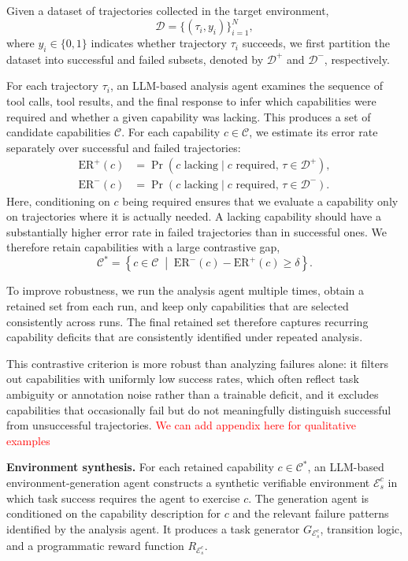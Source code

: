 Given a dataset of trajectories collected in the target environment,
\[
\mathcal{D} = \{(\tau_i, y_i)\}_{i=1}^{N},
\]
where $y_i \in \{0,1\}$ indicates whether trajectory $\tau_i$ succeeds, we first partition the dataset into successful and failed subsets, denoted by $\mathcal{D}^{+}$ and $\mathcal{D}^{-}$, respectively.

For each trajectory $\tau_i$, an LLM-based analysis agent examines the sequence of tool calls, tool results, and the final response to infer which capabilities were required and whether a given capability was lacking. 
 This produces a set of candidate capabilities $\mathcal{C}$. For each capability $c \in \mathcal{C}$, we estimate its error rate separately over successful and failed trajectories:
\begin{equation}
\begin{aligned}
\mathrm{ER}^{+}(c)
&= \Pr(c\text{ lacking} \mid c\text{ required},\, \tau \in \mathcal{D}^{+}), \\
\mathrm{ER}^{-}(c)
&= \Pr(c\text{ lacking} \mid c\text{ required},\, \tau \in \mathcal{D}^{-}).
\end{aligned}
\end{equation}
Here, conditioning on $c$ being required ensures that we evaluate a capability only on trajectories where it is actually needed. A lacking capability should have a substantially higher error rate in failed trajectories than in successful ones. We therefore retain capabilities with a large contrastive gap,
\[
\mathcal{C}^{*}
=
\left\{
c \in \mathcal{C}
\;\middle|\;
\mathrm{ER}^{-}(c) - \mathrm{ER}^{+}(c) \ge \delta
\right\}.
\]

To improve robustness, we run the analysis agent multiple times, obtain a retained set from each run, and keep only capabilities that are selected consistently across runs. The final retained set therefore captures recurring capability deficits that are consistently identified under repeated analysis.

This contrastive criterion is more robust than analyzing failures alone: it filters out capabilities with uniformly low success rates, which often reflect task ambiguity or annotation noise rather than a trainable deficit, and it excludes capabilities that occasionally fail but do not meaningfully distinguish successful from unsuccessful trajectories. \textcolor{red}{We can add appendix here for qualitative examples}


\noindent\textbf{Environment synthesis.}
For each retained capability $c \in \mathcal{C}^{*}$, an LLM-based environment-generation agent constructs a synthetic verifiable environment $\mathcal{E}_s^c$ in which task success requires the agent to exercise $c$. The generation agent is conditioned on the capability description for $c$ and the relevant failure patterns identified by the analysis agent. It produces a task generator $G_{\mathcal{E}_s^c}$, transition logic, and a programmatic reward function $R_{\mathcal{E}_s^c}$.

